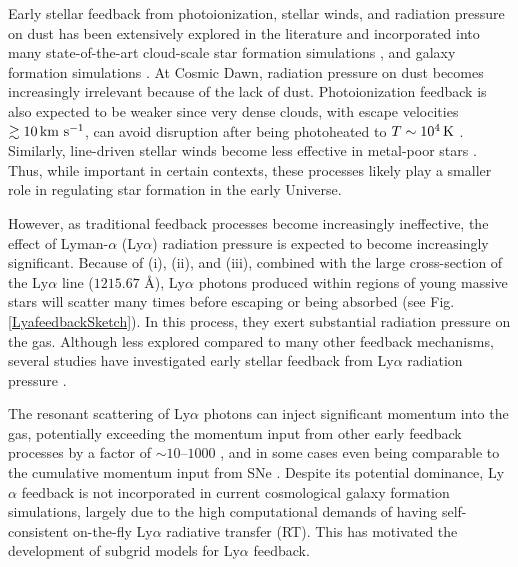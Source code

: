 \documentclass[fleqn,usenatbib]{mnras}
\newcommand\HII{\ion{H}{II}\xspace} %
\begin{document}
Early stellar feedback from photoionization, stellar winds, and radiation pressure on dust has been extensively explored in the literature and incorporated into many state-of-the-art cloud-scale star formation simulations \citep[e.g.][]{Raskutti2016, Grudic2018, Kim2018_RadPressure, Grudic2022_Starforge, Menon2022_IR, Menon2023_directRP, Menon2024}, and galaxy formation simulations \citep[e.g.][]{Kimm2017minihaloes, Hopkins2018_FIRE2, Agertz2020, Lahen2020, Hopkins2023}. At Cosmic Dawn, radiation pressure on dust becomes increasingly irrelevant because of the lack of dust. Photoionization feedback is also expected to be weaker since very dense clouds, with escape velocities $\gtrsim 10\, \rm km ~ s^{-1}$, can avoid disruption after being photoheated to $T \sim 10^4\,\rm K$ \citep{Dale2012, Dale2013, Kimm2016_GC, Grudic2018}. Similarly, line-driven stellar winds become less effective in metal-poor stars \citep[e.g.][]{Krtivcka2006_winds, Smith2014_winds}. Thus, while important in certain contexts, these processes likely play a smaller role in regulating star formation in the early Universe.

However, as traditional feedback processes become increasingly ineffective, the effect of Lyman-$\alpha$ (Ly$\alpha$) radiation pressure is expected to become increasingly significant. Because of (i), (ii), and (iii), combined with the large cross-section of the Ly$\alpha$ line ($1215.67$ Å), Ly$\alpha$ photons produced within \HII regions of young massive stars will scatter many times before escaping or being absorbed (see Fig. \ref{LyafeedbackSketch}). In this process, they exert substantial radiation pressure on the gas. Although less explored compared to many other feedback mechanisms, several studies have investigated early stellar feedback from Ly$\alpha$ radiation pressure \citep[e.g.][]{George1973, Cox1985, Birthell1990, McKee2008, Dijkstra2008, Yajima2014, Smith2016, Smith2017, Abe2018, Kimm2018, Kimm2019, Tomaselli2021, Han2022, Thomson2024}.

The resonant scattering of Ly$\alpha$ photons can inject significant momentum into the gas, potentially exceeding the momentum input from other early feedback processes by a factor of $\sim 10$--$1000$ \citep[e.g.][]{Kimm2018, Tomaselli2021}, and in some cases even being comparable to the cumulative momentum input from SNe \citep[][]{Kimm2018}. Despite its potential dominance, Ly$\alpha$ feedback is not incorporated in current cosmological galaxy formation simulations, largely due to the high computational demands of having self-consistent on-the-fly Ly$\alpha$ radiative transfer (RT). This has motivated the development of subgrid models for Ly$\alpha$ feedback. 
\end{document}
